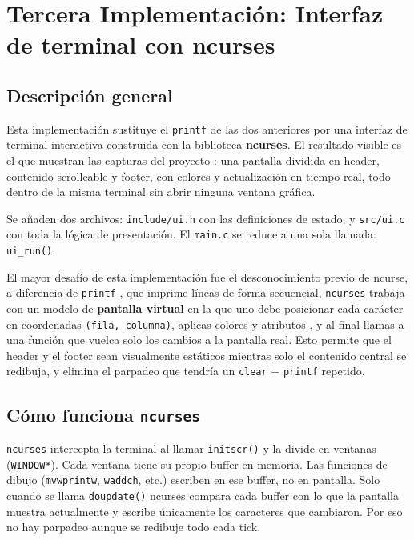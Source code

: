 \documentclass[12pt,letterpaper]{article}
\begin{document}
\newpage


\section*{Tercera Implementación: Interfaz de terminal con ncurses}

\subsection*{Descripción general}

Esta implementación sustituye el \texttt{printf} de las dos anteriores por una interfaz de terminal interactiva
construida con la biblioteca \textbf{ncurses}. El resultado visible es el que muestran las capturas del proyecto
: una pantalla dividida en header, contenido scrolleable y footer, con colores y actualización en tiempo real,
todo dentro de la misma terminal sin abrir ninguna ventana gráfica.

\medskip

Se añaden dos archivos: \texttt{include/ui.h} con las definiciones de estado, y
\texttt{src/ui.c} con toda la lógica de presentación. El \texttt{main.c} se
reduce a una sola llamada: \texttt{ui\_run()}.

\medskip

El mayor desafío de esta implementación fue el desconocimiento previo de ncurse, a diferencia de \texttt{printf}
, que imprime líneas de forma secuencial, \texttt{ncurses} trabaja con un modelo de \textbf{pantalla virtual}
en la que uno debe posicionar cada carácter en coordenadas \texttt{(fila, columna)}, aplicas colores y atributos
, y al final llamas a una función que vuelca solo los cambios a la pantalla real. Esto permite que el header y
el footer sean visualmente estáticos mientras solo el contenido central se redibuja, y elimina el parpadeo que
tendría un \texttt{clear} + \texttt{printf} repetido.

\subsection*{Cómo funciona \texttt{ncurses}}

\texttt{ncurses} intercepta la terminal al llamar \texttt{initscr()} y la divide en ventanas (\texttt{WINDOW*}).
Cada ventana tiene su propio buffer en memoria. Las funciones de dibujo (\texttt{mvwprintw}, \texttt{waddch},
etc.) escriben en ese buffer, no en pantalla. Solo cuando se llama \texttt{doupdate()} ncurses compara cada
buffer con lo que la pantalla muestra actualmente y escribe únicamente los caracteres que cambiaron.
Por eso no hay parpadeo aunque se redibuje todo cada tick.
\end{document}
